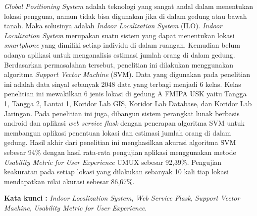 \begin{abstractind}
    \textit{Global Positioning System} adalah teknologi yang sangat andal dalam menentukan lokasi pengguna, namun tidak bisa digunakan jika di dalam gedung atau bawah tanah. Maka solusinya adalah \textit{Indoor Localization System} (ILO). \textit{Indoor Localization System} merupakan suatu sistem yang dapat menentukan lokasi \textit{smartphone} yang dimiliki setiap individu di dalam ruangan. Kemudian belum adanya aplikasi untuk menganalisis estimasi jumlah orang di dalam gedung. Berdasarkan permasalahan tersebut, penelitian ini dilakukan menggunakan algoritma \textit{Support Vector Machine} (SVM). Data yang digunakan pada penelitian ini adalah data sinyal sebanyak 2048 data yang terbagi menjadi 6 kelas. Kelas penelitian ini mewakilkan 6 jenis lokasi di gedung A FMIPA USK yaitu Tangga 1, Tangga 2, Lantai 1, Koridor Lab GIS, Koridor Lab Database, dan Koridor Lab Jaringan. Pada penelitian ini juga, dibangun sistem perangkat lunak berbasis android dan aplikasi \textit{web service flask} dengan penerapan algoritma SVM untuk membangun aplikasi penentuan lokasi dan estimasi jumlah orang di dalam gedung. Hasil akhir dari penelitian ini menghasilkan akurasi algoritma SVM sebesar 94\% dengan hasil rata-rata pengujian aplikasi menggunakan metode \textit{Usability Metric for User Experience} UMUX sebesar 92,39\%. Pengujian keakuratan pada setiap lokasi yang dilakukan sebanyak 10 kali tiap lokasi mendapatkan nilai akurasi sebesar 86,67\%.

    \bigskip
    \noindent
    \textbf{Kata kunci :} \textit{Indoor Localization System}, \textit{Web Service Flask}, \textit{Support Vector Machine}, \textit{Usability Metric for User Experience}.
\end{abstractind}